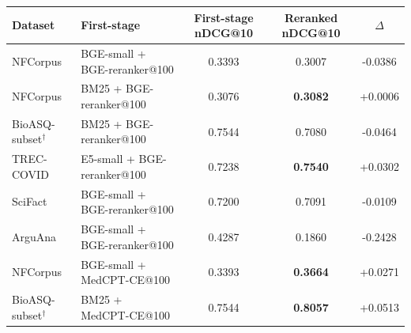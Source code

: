 \begin{tabular}{llSSS}
\toprule
\textbf{Dataset} & \textbf{First-stage} & \textbf{First-stage nDCG@10} & \textbf{Reranked nDCG@10} & \textbf{$\Delta$} \\
\midrule
NFCorpus & BGE-small + BGE-reranker@100 & 0.3393 & 0.3007 & -0.0386 \\
NFCorpus & BM25 + BGE-reranker@100 & 0.3076 & \textbf{0.3082} & +0.0006 \\
BioASQ-subset$^{\dagger}$ & BM25 + BGE-reranker@100 & 0.7544 & 0.7080 & -0.0464 \\
TREC-COVID & E5-small + BGE-reranker@100 & 0.7238 & \textbf{0.7540} & +0.0302 \\
SciFact & BGE-small + BGE-reranker@100 & 0.7200 & 0.7091 & -0.0109 \\
ArguAna & BGE-small + BGE-reranker@100 & 0.4287 & 0.1860 & -0.2428 \\
\midrule
NFCorpus & BGE-small + MedCPT-CE@100 & 0.3393 & \textbf{0.3664} & +0.0271 \\
BioASQ-subset$^{\dagger}$ & BM25 + MedCPT-CE@100 & 0.7544 & \textbf{0.8057} & +0.0513 \\
\bottomrule
\end{tabular}

